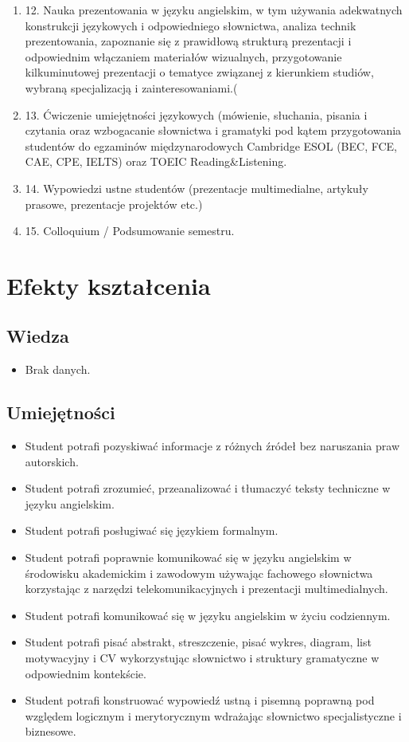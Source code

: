 \documentclass[12pt, a4paper]{article}
\begin{document}
\begin{enumerate}
  \item 12. Nauka prezentowania w języku angielskim, w tym używania adekwatnych konstrukcji językowych i odpowiedniego słownictwa, analiza technik prezentowania, zapoznanie się z prawidłową strukturą prezentacji i odpowiednim włączaniem materiałów wizualnych, przygotowanie kilkuminutowej prezentacji o tematyce związanej z kierunkiem studiów, wybraną specjalizacją i zainteresowaniami.(
  \item 13. Ćwiczenie umiejętności językowych (mówienie, słuchania, pisania i czytania oraz wzbogacanie słownictwa i gramatyki pod kątem przygotowania studentów do egzaminów międzynarodowych Cambridge ESOL (BEC, FCE, CAE, CPE, IELTS) oraz TOEIC Reading\&Listening.
  \item 14. Wypowiedzi ustne studentów (prezentacje multimedialne, artykuły prasowe,  prezentacje projektów etc.)
  \item 15. Colloquium / Podsumowanie semestru.
\end{enumerate}

\section{Efekty kształcenia}

\subsection*{Wiedza}
\begin{itemize}
  \item Brak danych.
\end{itemize}

\subsection*{Umiejętności}
\begin{itemize}
  \item Student potrafi pozyskiwać informacje z różnych źródeł bez naruszania praw autorskich.
  \item Student potrafi zrozumieć, przeanalizować i tłumaczyć teksty techniczne w języku angielskim.
  \item Student potrafi posługiwać się językiem formalnym.
  \item Student potrafi poprawnie komunikować się w języku angielskim w środowisku akademickim i zawodowym używając fachowego słownictwa korzystając z narzędzi telekomunikacyjnych i prezentacji multimedialnych.
  \item Student potrafi komunikować się w języku angielskim w życiu codziennym.
  \item Student potrafi pisać abstrakt, streszczenie, pisać wykres, diagram, list motywacyjny i CV wykorzystując słownictwo i struktury gramatyczne w odpowiednim kontekście.
  \item Student potrafi konstruować wypowiedź ustną i pisemną poprawną pod względem logicznym i merytorycznym wdrażając słownictwo specjalistyczne i biznesowe.
\end{itemize}
\end{document}
